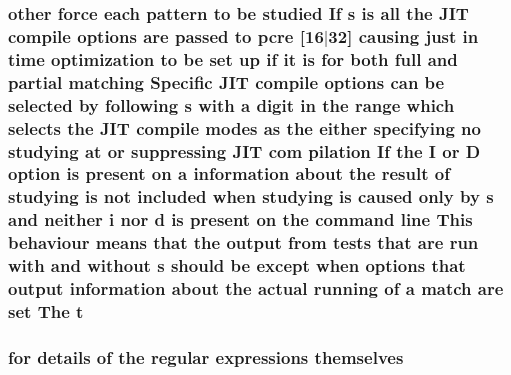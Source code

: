 \subsubsection[{\texorpdfstring{t}{t}}]{ other force each {\bf pattern} {\bf to} {\bf be} {\bf studied} If {\bf s} {\bf is} {\bf all} the J\+IT {\bf compile} {\bf options} {\bf are} passed {\bf to} {\bf pcre} \mbox{[}16$\vert$32\mbox{]} causing just {\bf in} {\bf time} optimization {\bf to} {\bf be} {\bf set} up {\bf if} {\bf it} {\bf is} for both full and {\bf partial} {\bf matching} Specific J\+IT {\bf compile} {\bf options} {\bf can} {\bf be} {\bf selected} by following {\bf s} {\bf with} {\bf a} digit {\bf in} the range {\bf which} selects the J\+IT {\bf compile} {\bf modes} {\bf as} the either {\bf specifying} no {\bf studying} at {\bf or} suppressing J\+IT com pilation If the {\bf I} {\bf or} {\bf D} {\bf option} {\bf is} {\bf present} {\bf on} {\bf a} information about the {\bf result} {\bf of} {\bf studying} {\bf is} {\bf not} {\bf included} when {\bf studying} {\bf is} caused only by {\bf s} and neither {\bf i} nor {\bf d} {\bf is} {\bf present} {\bf on} the {\bf command} {\bf line} This behaviour means that the {\bf output} {\bf from} {\bf tests} that {\bf are} {\bf run} {\bf with} and without {\bf s} should {\bf be} {\bf except} when {\bf options} that {\bf output} information about the actual running {\bf of} {\bf a} {\bf match} {\bf are} {\bf set} The t}\hypertarget{pcretest_8txt_a9ffb27fb8e1f90c17b13303fee2fb883}{}\label{pcretest_8txt_a9ffb27fb8e1f90c17b13303fee2fb883}
\subsubsection[{\texorpdfstring{themselves}{themselves}}]{\setlength{\rightskip}{0pt plus 5cm}for {\bf details} {\bf of} the regular {\bf expressions} themselves}\hypertarget{pcretest_8txt_a52bf23c086c7421dd94ad21c89ac2e65}{}\label{pcretest_8txt_a52bf23c086c7421dd94ad21c89ac2e65}
